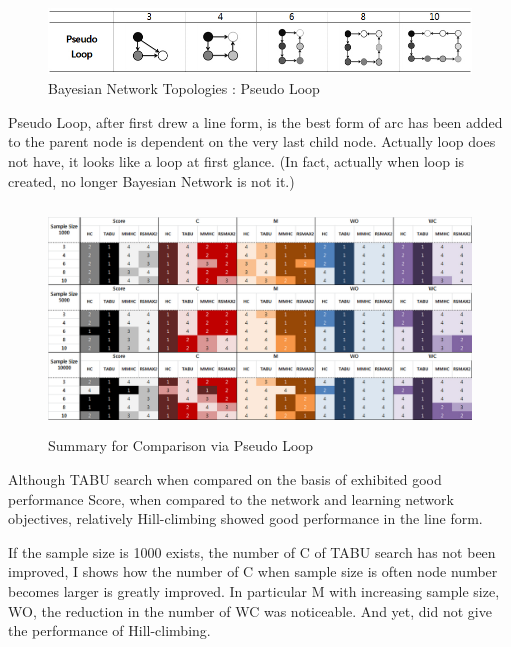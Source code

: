	\begin{figure}[h]
	\centering
		\includegraphics[height=50pt]{Topologies_PseudoLoop}
		\caption{Bayesian Network Topologies : Pseudo Loop}
	\end{figure}	

	Pseudo Loop, after first drew a line form, is the best form of arc has been added to the parent node is dependent on the very last child node. Actually loop does not have, it looks like a loop at first glance. (In fact, actually when loop is created, no longer Bayesian Network is not it.)

\begin{figure}[!bhp]
	\centering
		\includegraphics[height=170pt]{Result_PseudoLoop}
		\caption{Summary for Comparison via Pseudo Loop}
	\end{figure}	

Although TABU search when compared on the basis of exhibited good performance Score, when compared to the network and learning network objectives, relatively Hill-climbing showed good performance in the line form.

If the sample size is 1000 exists, the number of C of TABU search has not been improved, I shows how the number of C when sample size is often node number becomes larger is greatly improved. In particular M with increasing sample size, WO, the reduction in the number of WC was noticeable. And yet, did not give the performance of Hill-climbing.

